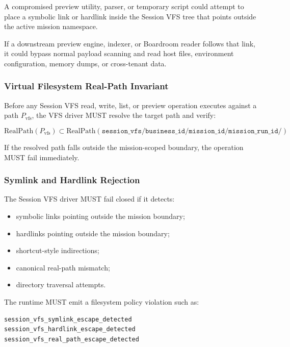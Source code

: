 A compromised preview utility, parser, or temporary script could attempt to place a symbolic link or hardlink inside the Session VFS tree that points outside the active mission namespace.

If a downstream preview engine, indexer, or Boardroom reader follows that link, it could bypass normal payload scanning and read host files, environment configuration, memory dumps, or cross-tenant data.

\subsubsection{Virtual Filesystem Real-Path Invariant}

Before any Session VFS read, write, list, or preview operation executes against a path $P_{\mathrm{vfs}}$, the VFS driver MUST resolve the target path and verify:

\begin{equation}
\mathrm{RealPath}(P_{\mathrm{vfs}})
\subset
\mathrm{RealPath}
(
\mathtt{session\_vfs}/
\mathtt{business\_id}/
\mathtt{mission\_id}/
\mathtt{mission\_run\_id}/
)
\end{equation}

If the resolved path falls outside the mission-scoped boundary, the operation MUST fail immediately.

\subsubsection{Symlink and Hardlink Rejection}

The Session VFS driver MUST fail closed if it detects:

\begin{itemize}
  \item symbolic links pointing outside the mission boundary;
  \item hardlinks pointing outside the mission boundary;
  \item shortcut-style indirections;
  \item canonical real-path mismatch;
  \item directory traversal attempts.
\end{itemize}

The runtime MUST emit a filesystem policy violation such as:

\begin{verbatim}
session_vfs_symlink_escape_detected
session_vfs_hardlink_escape_detected
session_vfs_real_path_escape_detected
\end{verbatim}

